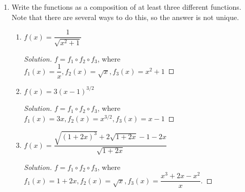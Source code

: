 \documentclass[12pt]{article}
\newenvironment{solution}{\begin{proof}[Solution]}{\end{proof}}
\begin{document}
\begin{enumerate}
		
		\begin{enumerate}
			\item $(f+g)(-2),(fg)(0),\dfrac{f}{g}(1),\dfrac{g}{f}(1)$
			\item $f\circ g(-2), g\circ f(0),g\circ g(1), f\circ f(2)$
		\end{enumerate}
		
		\begin{solution}
			\begin{itemize}
				\item[(a)] $(f+g)(-2)=f(-2)+g(-2)=-3+(-4)=-7,\\
				(fg)(0) \text{ is undefined since } g(0) \text{ is undefined,}\\
				\dfrac{f}{g}(1) \text{ is undefined since } g(1)=0\\
				\dfrac{g}{f}(1)=\dfrac{g(1)}{f(1)}=\dfrac{0}{1}=0$.
				\item[(b)] $f\circ g(-2)=f(g(-2))=f(-4) \text{ cannot be determined based on the image},\\
				g\circ f(0)=g(f(0))=g(1)=0,\\
				g\circ g(1)=g(g(1))=g(0) \text{ is undefined},\\
				f\circ f(2)=f(f(2))=f(2)=2$.
			\end{itemize}
		\end{solution}
		
		\item Write the functions as a composition of at least three different functions. Note that there are several ways to do this, so the answer is not unique.
		\begin{enumerate}
			\item $f(x)=\dfrac{1}{\sqrt{x^2+1}}$
			\begin{solution}
				$f=f_1\circ f_2 \circ f_3$, where $f_1(x)=\dfrac{1}{x},f_2(x)=\sqrt{x},f_3(x)=x^2+1$
			\end{solution}
			\item $f(x)=3(x-1)^{3/2}$
			\begin{solution}
				$f=f_1\circ f_2 \circ f_3$, where $f_1(x)=3x,f_2(x)=x^{3/2},f_3(x)=x-1$
			\end{solution}
			\item $f(x)=\dfrac{\sqrt{(1+2x)^3}+2\sqrt{1+2x}-1-2x}{\sqrt{1+2x}}$
			\begin{solution}
				$f=f_1\circ f_2 \circ f_3$, where $f_1(x)=1+2x,f_2(x)=\sqrt{x},f_3(x)=\dfrac{x^3+2x-x^2}{x}$.
			\end{solution}
		\end{enumerate}
		

\end{enumerate}
\end{document}
